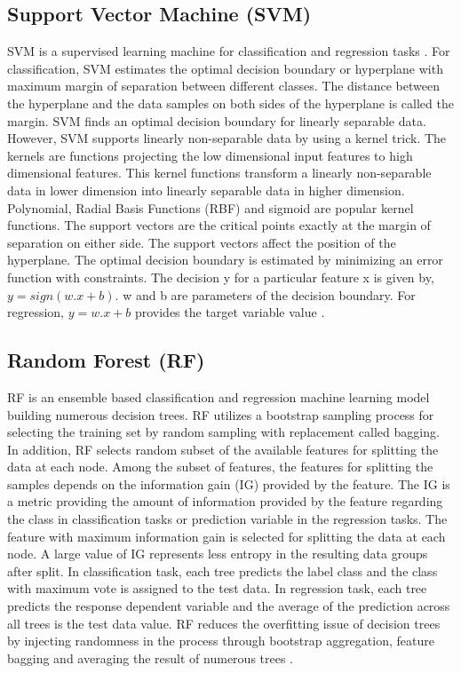 \subsection{Support Vector Machine (SVM)}

SVM is a supervised learning machine for classification and regression tasks \cite{SVM_tutorials}. For classification, SVM estimates the optimal decision boundary or hyperplane with maximum margin of separation between different classes. The distance between the hyperplane and the data samples on both sides of the hyperplane is called the margin. SVM finds an optimal decision boundary for linearly separable data. However, SVM supports linearly non-separable data by using a kernel trick. The kernels are functions projecting the low dimensional input features to high dimensional features. This kernel functions transform a linearly non-separable data in lower dimension into linearly separable data in higher dimension. Polynomial, Radial Basis Functions (RBF) and sigmoid are popular kernel functions. The support vectors are the critical points exactly at the margin of separation on either side. The support vectors affect the position of the hyperplane. The optimal decision boundary is estimated by minimizing an error function with constraints. The decision y for a particular feature x is given by, $y = sign(w.x + b)$. w and b are parameters of the decision boundary. For regression, $y = w.x +b$ provides the target variable value \cite{SVM_tutorials}.


\subsection{Random Forest (RF)}

RF is an ensemble based classification and regression machine learning model building numerous decision trees. RF utilizes a bootstrap sampling process for selecting the training set by random sampling with replacement called bagging. In addition, RF selects random subset of the available features for splitting the data at each node. Among the subset of features, the features for splitting the samples depends on the information gain (IG) provided by the feature. The IG is a metric providing the amount of information provided by the feature regarding the class in classification tasks or prediction variable in the regression tasks. The feature with maximum information gain is selected for splitting the data at each node. A large value of IG represents less entropy in the resulting data groups after split.  In classification task, each tree predicts the label class and the class with maximum vote is assigned to the test data. In regression task, each tree predicts the response dependent variable and the average of the prediction across all trees is the test data value. RF reduces the overfitting issue of decision trees by injecting randomness in the process through bootstrap aggregation, feature bagging and averaging the result of numerous trees \cite{RF_book} \cite{RF_mainpaper}.

